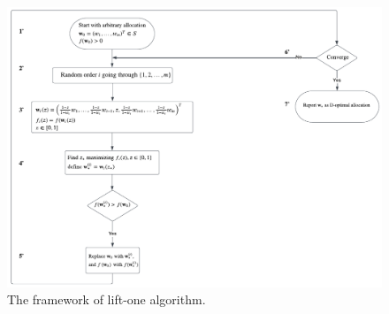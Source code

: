 \begin{figure}[htb!]
    \centering
    \includegraphics[width=\textwidth]{figures/unconstrained_lift_one.png}
    \caption{The framework of lift-one algorithm.}
    \label{fig:liftone_algo}
\end{figure}

